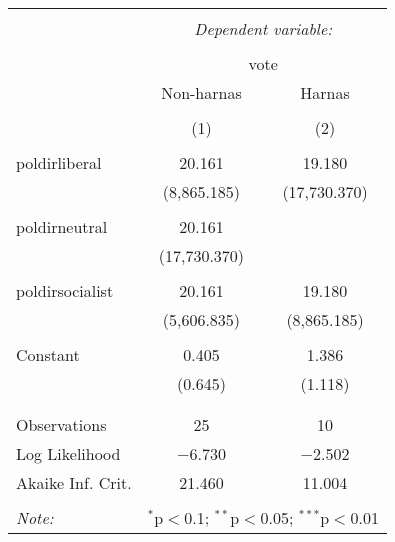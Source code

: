 
\begin{table}[!htbp] \centering 
  \caption{} 
  \label{} 
\begin{tabular}{@{\extracolsep{5pt}}lcc} 
\\[-1.8ex]\hline 
\hline \\[-1.8ex] 
 & \multicolumn{2}{c}{\textit{Dependent variable:}} \\ 
\cline{2-3} 
\\[-1.8ex] & \multicolumn{2}{c}{vote} \\ 
 & Non-harnas & Harnas \\ 
\\[-1.8ex] & (1) & (2)\\ 
\hline \\[-1.8ex] 
 poldirliberal & 20.161 & 19.180 \\ 
  & (8,865.185) & (17,730.370) \\ 
  & & \\ 
 poldirneutral & 20.161 &  \\ 
  & (17,730.370) &  \\ 
  & & \\ 
 poldirsocialist & 20.161 & 19.180 \\ 
  & (5,606.835) & (8,865.185) \\ 
  & & \\ 
 Constant & 0.405 & 1.386 \\ 
  & (0.645) & (1.118) \\ 
  & & \\ 
\hline \\[-1.8ex] 
Observations & 25 & 10 \\ 
Log Likelihood & $-$6.730 & $-$2.502 \\ 
Akaike Inf. Crit. & 21.460 & 11.004 \\ 
\hline 
\hline \\[-1.8ex] 
\textit{Note:}  & \multicolumn{2}{r}{$^{*}$p$<$0.1; $^{**}$p$<$0.05; $^{***}$p$<$0.01} \\ 
\end{tabular} 
\end{table} 
